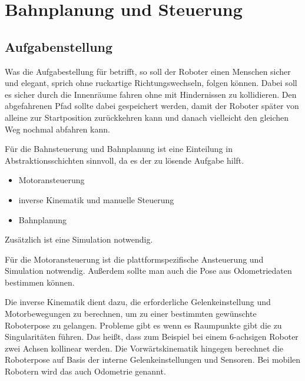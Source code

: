 \chapter{Bahnplanung und Steuerung}
\label{bahnplanung_steuerung_cha}

\section{Aufgabenstellung}
\label{bahnplanung_aufgabenstellung_sec}
\authorsection{\editoroier}


Was die Aufgabestellung für betrifft, so soll der Roboter einen Menschen sicher und elegant, sprich ohne ruckartige Richtungswechseln, folgen können. Dabei soll es sicher durch die Innenräume fahren ohne mit Hindernissen zu kollidieren. Den abgefahrenen Pfad sollte dabei gespeichert werden, damit der Roboter später von alleine zur Startposition zurückkehren kann und danach vielleicht den gleichen Weg nochmal abfahren kann.


Für die Bahnsteuerung und Bahnplanung ist eine Einteilung in Abstraktionsschichten sinnvoll, da es der zu lösende Aufgabe hilft.
\begin{itemize}
	\item Motoransteuerung
	\item inverse Kinematik und manuelle Steuerung
	\item Bahnplanung	
\end{itemize}
Zusätzlich ist eine Simulation notwendig.

Für die Motoransteuerung ist die plattformspezifische Ansteuerung und Simulation notwendig. Außerdem sollte man auch die Pose aus Odometriedaten bestimmen können.

Die inverse Kinematik dient dazu, die erforderliche Gelenkeinstellung und Motorbewegungen zu berechnen, um zu einer bestimmten gewünschte Roboterpose zu gelangen. Probleme gibt es wenn es Raumpunkte gibt die zu Singularitäten führen. Das heißt, dass zum Beispiel bei einem 6-achsigen Roboter zwei Achsen kollinear werden. Die Vorwärtskinematik hingegen berechnet die Roboterpose auf Basis der interne Gelenkeinstellungen und Sensoren. Bei mobilen Robotern wird das auch Odometrie genannt.

